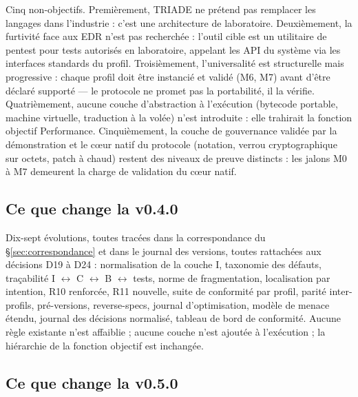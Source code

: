 Cinq non-objectifs. Premièrement, TRIADE ne prétend pas remplacer les langages dans
l’industrie : c’est une architecture de laboratoire. Deuxièmement, la furtivité face aux
EDR n’est pas recherchée : l’outil cible est un utilitaire de pentest pour tests autorisés
en laboratoire, appelant les API du système via les interfaces standards du profil.
Troisièmement, l’universalité est structurelle mais progressive : chaque profil doit être
instancié et validé (M6, M7) avant d’être déclaré supporté — le protocole ne promet pas la
portabilité, il la vérifie. Quatrièmement, aucune couche d’abstraction à l’exécution
(bytecode portable, machine virtuelle, traduction à la volée) n’est introduite : elle
trahirait la fonction objectif Performance. Cinquièmement, la couche de gouvernance
validée par la démonstration et le cœur natif du protocole (notation, verrou
cryptographique sur octets, patch à chaud) restent des niveaux de preuve distincts : les
jalons M0 à M7 demeurent la charge de validation du cœur natif.

\subsection{Ce que change la v0.4.0}\label{sec:nouveautes}

Dix-sept évolutions, toutes tracées dans la correspondance du §\ref{sec:correspondance} et
dans le journal des versions, toutes rattachées aux décisions D19 à D24 : normalisation de
la couche I, taxonomie des défauts, traçabilité I $\leftrightarrow$ C $\leftrightarrow$
B $\leftrightarrow$ tests, norme de fragmentation, localisation par intention, R10
renforcée, R11 nouvelle, suite de conformité par profil, parité inter-profils,
pré-versions, reverse-specs, journal d’optimisation, modèle de menace étendu, journal des
décisions normalisé, tableau de bord de conformité. Aucune règle existante n’est
affaiblie ; aucune couche n’est ajoutée à l’exécution ; la hiérarchie de la fonction
objectif est inchangée.

\subsection{Ce que change la v0.5.0}

